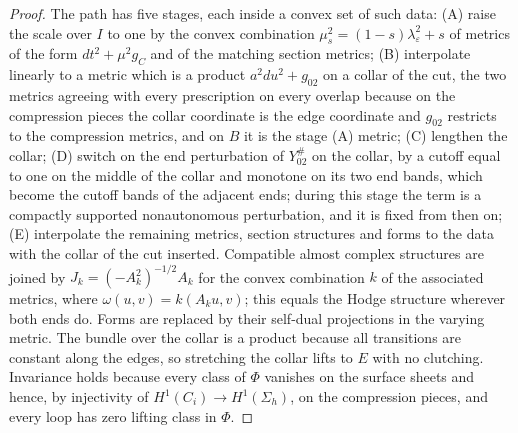 \documentclass[11pt]{amsart}
\theoremstyle{definition}
\theoremstyle{remark}
\theoremstyle{plain}
\numberwithin{equation}{section}
\newcommand{\eps}{\varepsilon}
\begin{document}
\begin{proof}
The path has five stages, each inside a convex set of such data:
(A) raise the scale over $I$ to one by the convex combination
$\mu_s^2=(1-s)\lambda_\eps^2+s$ of metrics of the form $dt^2+\mu^2g_C$ and of
the matching section metrics; (B) interpolate linearly to a metric which is
a product $a^2du^2+g_{02}$ on a collar of the cut, the two metrics agreeing
with every prescription on every overlap because on the compression pieces
the collar coordinate is the edge coordinate and $g_{02}$ restricts to the
compression metrics, and on $B$ it is the stage (A) metric; (C) lengthen
the collar; (D) switch on the end perturbation of $Y_{02}^\#$ on the
collar, by a cutoff equal to one on the middle of the collar and monotone on its two end
bands, which become the cutoff bands of the adjacent ends; during this stage the term is a
compactly supported nonautonomous perturbation, and it is fixed from then on; (E) interpolate the remaining metrics, section structures and
forms to the data with the collar of the cut inserted. Compatible almost complex structures are
joined by $J_k=(-A_k^2)^{-1/2}A_k$ for the convex combination $k$ of the
associated metrics, where $\omega(u,v)=k(A_ku,v)$; this equals the Hodge
structure wherever both ends do. Forms are replaced by their self-dual
projections in the varying metric. The bundle over the collar is a product
because all transitions are constant along the edges, so stretching the
collar lifts to $E$ with no clutching. Invariance holds because every class
of $\Phi$ vanishes on the surface sheets and hence, by injectivity of
$H^1(C_i)\to H^1(\Sigma_h)$, on the compression pieces, and every loop has
zero lifting class in $\Phi$.
\end{proof}
\end{document}
